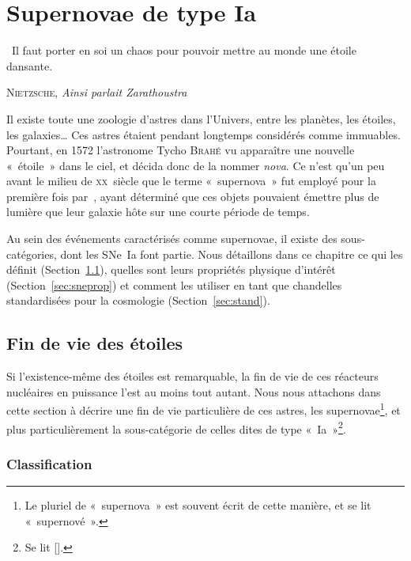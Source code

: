 \documentclass[../main/main.tex]{subfiles}
\begin{document}
\raggedbottom


\chapter{Supernovae de type Ia}\label{ch:sne}

\epigraph{\openquote\ Il faut porter en soi un chaos pour pouvoir mettre
au monde une étoile dansante.\closequote}{\textsc{Nietzsche}, \textit{Ainsi
parlait Zarathoustra}}

Il existe toute une zoologie d'astres dans l'Univers, entre les planètes, les
étoiles, les galaxies… Ces astres étaient pendant longtemps considérés comme
immuables. Pourtant, en 1572 l'astronome Tycho \textsc{Brahé} vu apparaître une
nouvelle «~étoile~» dans le ciel, et décida donc de la nommer \textit{nova}. Ce
n'est qu'un peu avant le milieu de \textsc{xx}\ieme~siècle que le terme
«~supernova~» fut employé pour la première fois par~\cite{baade1934}, ayant
déterminé que ces objets pouvaient émettre plus de lumière que leur galaxie hôte
sur une courte période de temps.

Au sein des événements caractérisés comme supernovae, il existe des
sous-catégories, dont les SNe~Ia font partie. Nous détaillons dans ce chapitre
ce qui les définit (Section~\ref{sec:death}), quelles sont leurs propriétés
physique d'intérêt (Section~\ref{sec:sneprop}) et comment les utiliser en tant
que chandelles standardisées pour la cosmologie (Section~\ref{sec:stand}).

\vfill
\minitoc
\vfill
\newpage

\section{Fin de vie des étoiles}\label{sec:death}

Si l'existence-même des étoiles est remarquable, la fin de vie de ces réacteurs
nucléaires en puissance l'est au moins tout autant. Nous nous attachons dans
cette section à décrire une fin de vie particulière de ces astres, les
supernovae\footnote{Le pluriel de «~supernova~» est souvent écrit de cette
manière, et se lit «~supernové~».}, et plus particulièrement la sous-catégorie
de celles dites de type «~Ia~»\footnote{Se lit [].}.

\subsection{Classification}\label{ssec:class} %
\end{document}
